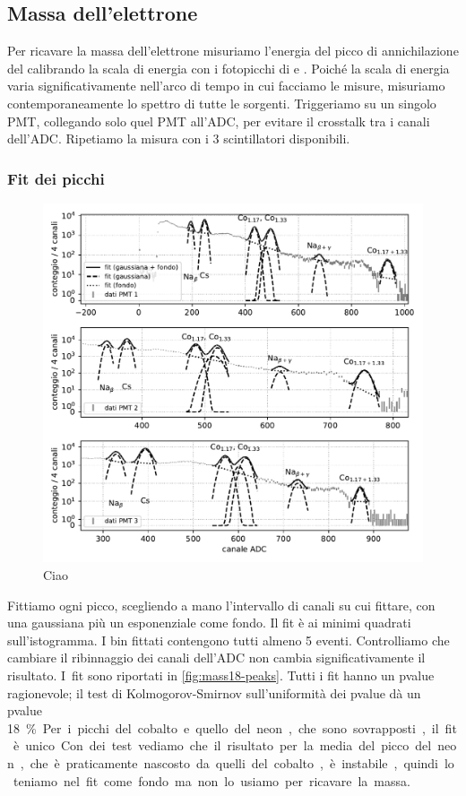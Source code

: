 \subsection{Massa dell'elettrone}

Per ricavare la massa dell'elettrone misuriamo l'energia del picco di annichilazione del \na{}
calibrando la scala di energia con i fotopicchi di \co{} e \cs{}.
Poiché la scala di energia varia significativamente nell'arco di tempo in cui facciamo le misure,
misuriamo contemporaneamente lo spettro di tutte le sorgenti.
Triggeriamo su un singolo PMT,
collegando solo quel PMT all'ADC, per evitare il crosstalk tra i canali dell'ADC.
Ripetiamo la misura con i 3 scintillatori disponibili.

\subsubsection{Fit dei picchi}

\begin{figure}
	\includegraphics[width=\textwidth]{immagini/mass18-peaks}
	\caption{\label{fig:mass18-peaks}
	Ciao}
\end{figure}

Fittiamo ogni picco, scegliendo a mano l'intervallo di canali su cui fittare,
con una gaussiana più un esponenziale come fondo.
Il fit è ai minimi quadrati sull'istogramma.
I bin fittati contengono tutti almeno 5 eventi.
Controlliamo che cambiare il ribinnaggio dei canali dell'ADC non cambia significativamente il risultato.
I~fit sono riportati in \autoref{fig:mass18-peaks}.
Tutti i fit hanno un pvalue ragionevole;
il test di Kolmogorov-Smirnov sull'uniformità dei pvalue dà un pvalue \SI{18}\%.
Per i picchi del cobalto e quello del neon, che sono sovrapposti, il fit è unico.
Con dei test vediamo che il risultato per la media del picco del neon,
che è praticamente nascosto da quelli del cobalto,
è instabile, quindi lo teniamo nel fit come fondo ma non lo usiamo per ricavare la massa.

